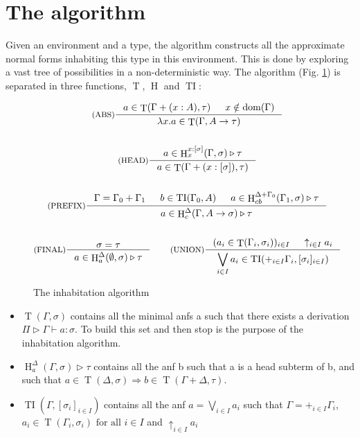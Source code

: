 \documentclass{article}
\DeclareMathOperator{\iT}{T}
\DeclareMathOperator{\iH}{H}
\DeclareMathOperator{\iTI}{TI}
\DeclareMathOperator{\iDom}{dom}
\begin{document}
\section{The algorithm}
\label{exe}
Given an environment and a type, the algorithm constructs all the approximate normal forms inhabiting this type in this environment. This is done by exploring a vast tree of possibilities in a non-deterministic way. The algorithm (Fig. \ref{INH}) is separated in three functions, $\iT$, $\iH$ and $\iTI$:
\begin{figure}[h]
    \begin{mdframed}
        \begin{gather*}
            \inference[(ABS)]{a \in \iT(\Gamma + (x : A), \tau) & x \notin \iDom(\Gamma)}{\lambda x.a \in \iT(\Gamma, A \rightarrow \tau)}
            \\ \\
            \inference[(HEAD)]{a \in \iH^{x:[\sigma]}_x(\Gamma, \sigma) \triangleright \tau}{a \in\iT(\Gamma + (x:[\sigma]), \tau) }
            \\ \\
            \inference[(PREFIX)]{\Gamma = \Gamma_0 + \Gamma_1 & b \in \iTI(\Gamma_0, A) & a \in \iH^{\Delta + \Gamma_0}_{cb}(\Gamma_1, \sigma) \triangleright \tau}{a \in \iH^{\Delta}_c(\Gamma, A \rightarrow \sigma) \triangleright \tau}
            \\ \\
            \inference[(FINAL)]{\sigma = \tau}{a \in \iH^{\Delta}_a(\emptyset, \sigma) \triangleright \tau}
            \qquad
            \inference[(UNION)]{(a_i \in \iT(\Gamma_i, \sigma_i))_{i \in I} & \uparrow_{i \in I}a_i}{\displaystyle \bigvee_{i \in I} a_i \in \iTI(+_{i \in I}\Gamma_i, [\sigma_i]_{i \in I}) }
        \end{gather*}
    \end{mdframed}
  \caption{The inhabitation algorithm}
  \label{INH}
\end{figure}
\begin{itemize}
\item $\iT(\Gamma, \sigma)$ contains all the minimal anfs a such that there exists a derivation $\Pi \triangleright \Gamma \vdash a : \sigma$. To build this set and then stop is the purpose of the inhabitation algorithm.
\item $\iH^\Delta_a(\Gamma, \sigma) \triangleright \tau$ contains all the anf b such that a is a head subterm of b, and such that $a \in \iT(\Delta, \sigma) \Rightarrow b \in \iT(\Gamma + \Delta, \tau)$.
\item $\iTI(\Gamma, [\sigma_i]_{i \in I})$ contains all the anf $a = \bigvee_{i\in I}a_i$ such that $ \Gamma = +_{i \in I} \Gamma_i $, $ a_i \in \iT(\Gamma_i, \sigma_i)\text{ for all }i \in I $ and $\uparrow_{i \in I}a_i$
\end{itemize}
\end{document}

